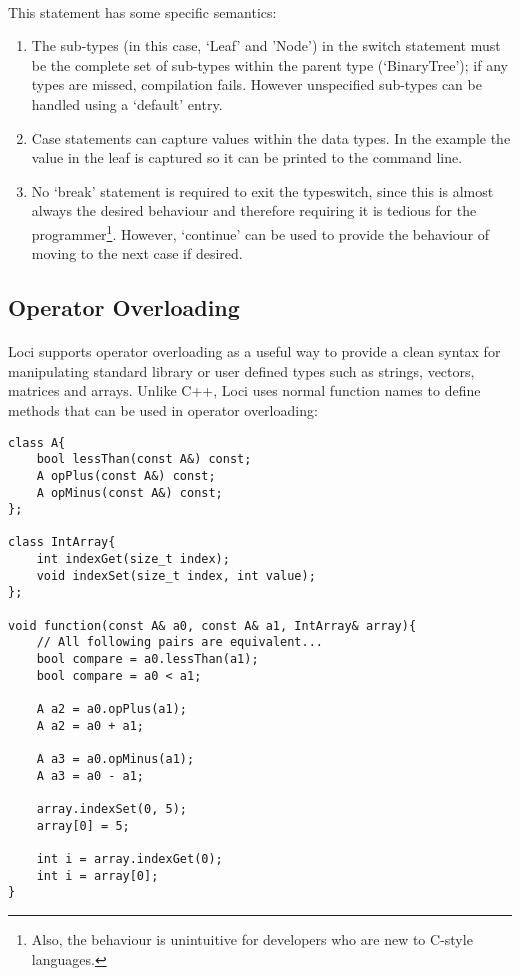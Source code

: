 \documentclass[12pt,twoside,notitlepage]{report}
\begin{document}
\paragraph{}
This statement has some specific semantics:

\begin{enumerate}
\item The sub-types (in this case, `Leaf' and 'Node') in the switch statement must be the complete set of sub-types within the parent type (`BinaryTree'); if any types are missed, compilation fails. However unspecified sub-types can be handled using a `default' entry.
\item Case statements can capture values within the data types. In the example the value in the leaf is captured so it can be printed to the command line.
\item No `break' statement is required to exit the typeswitch, since this is almost always the desired behaviour and therefore requiring it is tedious for the programmer\footnote{Also, the behaviour is unintuitive for developers who are new to C-style languages.}. However, `continue' can be used to provide the behaviour of moving to the next case if desired.
\end{enumerate}

\subsection{Operator Overloading}

\paragraph{}
Loci supports operator overloading as a useful way to provide a clean syntax for manipulating standard library or user defined types such as strings, vectors, matrices and arrays. Unlike C++, Loci uses normal function names to define methods that can be used in operator overloading:

\small{
\begin{verbatim}
class A{
    bool lessThan(const A&) const;
    A opPlus(const A&) const;
    A opMinus(const A&) const;
};

class IntArray{
    int indexGet(size_t index);
    void indexSet(size_t index, int value);
};

void function(const A& a0, const A& a1, IntArray& array){
    // All following pairs are equivalent...
    bool compare = a0.lessThan(a1);
    bool compare = a0 < a1;
    
    A a2 = a0.opPlus(a1);
    A a2 = a0 + a1;
    
    A a3 = a0.opMinus(a1);
    A a3 = a0 - a1;
    
    array.indexSet(0, 5);
    array[0] = 5;
    
    int i = array.indexGet(0);
    int i = array[0];
}
\end{verbatim}
}
\end{document}
